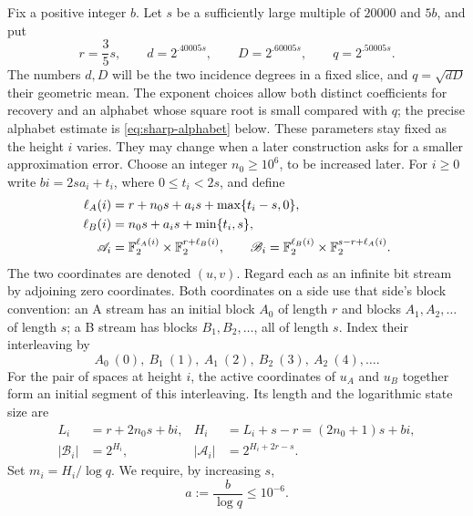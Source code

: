 Fix a positive integer $b$.  Let $s$ be a sufficiently large multiple of
$20000$ and $5b$, and put
\begin{equation}\label{eq:label-parameters}
 r=\frac35s,\qquad d=2^{.40005s},\qquad
 D=2^{.60005s},\qquad q=2^{.50005s}.
\end{equation}
The numbers $d,D$ will be the two incidence degrees in a fixed slice,
and $q=\sqrt{dD}$ their geometric mean.  The exponent choices allow both
distinct coefficients for recovery and an alphabet whose square root is
small compared with $q$; the precise alphabet estimate is
\eqref{eq:sharp-alphabet} below.
These parameters stay fixed as the height $i$ varies.  They may change
when a later construction asks for a smaller approximation error.
Choose an integer $n_0\ge 10^6$, to be increased later.  For $i\ge0$ write
$bi=2s a_i+t_i$, where $0\le t_i<2s$, and define
\begin{align}
 \ell_A(i)&=r+n_0s+a_is+\max\{t_i-s,0\},\notag\\
 \ell_B(i)&=n_0s+a_is+\min\{t_i,s\},\label{eq:stream-lengths}\\
 \mathscr A_i&=\mathbb F_2^{\ell_A(i)}\times\mathbb F_2^{r+\ell_B(i)},\qquad
 \mathscr B_i=\mathbb F_2^{\ell_B(i)}\times\mathbb F_2^{s-r+\ell_A(i)}.\notag
\end{align}
The two coordinates are denoted $(u,v)$.  Regard each as an infinite bit
stream by adjoining zero coordinates.  Both coordinates on a side use
that side's block convention: an A stream has an initial block
$A_0$ of length $r$ and blocks $A_1,A_2,\ldots$ of length $s$; a B stream
has blocks $B_1,B_2,\ldots$, all of length $s$.  Index their interleaving by
\begin{equation}\label{eq:source-order}
 A_0\ (0),\ B_1\ (1),\ A_1\ (2),\ B_2\ (3),\ A_2\ (4),\ldots.
\end{equation}
For the pair of spaces at height $i$, the active coordinates of $u_A$ and
$u_B$ together form an initial segment of this interleaving.  Its length
and the logarithmic state size are
\begin{equation}\label{eq:state-sizes}
 \begin{aligned}
 L_i&=r+2n_0s+bi,&
 H_i&=L_i+s-r=(2n_0+1)s+bi,\\
 |\mathscr B_i|&=2^{H_i},&
 |\mathscr A_i|&=2^{H_i+2r-s}.
 \end{aligned}
\end{equation}
Set $m_i=H_i/\log q$.  We require, by increasing $s$,
\begin{equation}\label{eq:label-slope}
 a:=\frac b{\log q}\le10^{-6}.
\end{equation}

